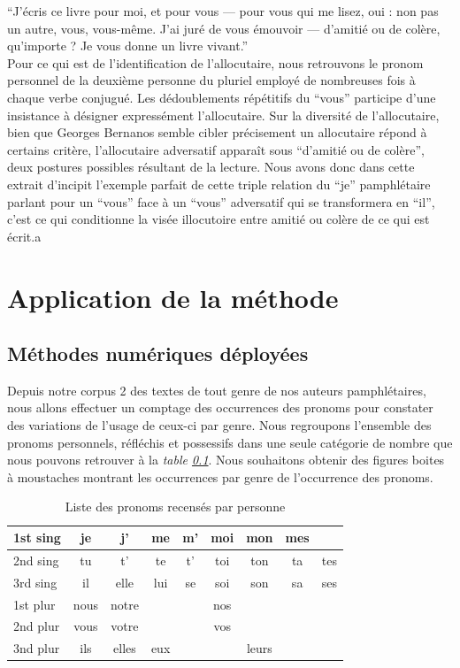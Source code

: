 	\enquote{J'écris ce livre pour moi, et pour vous — pour vous qui me lisez, oui : non pas un autre, vous, vous-même. J'ai juré de vous émouvoir — d'amitié ou de colère, qu'importe ? Je vous donne un livre vivant.}\\

Pour ce qui est de l'identification de l'allocutaire, nous retrouvons le pronom personnel de la deuxième personne du pluriel employé de nombreuses fois à chaque verbe conjugué. Les dédoublements répétitifs du \enquote{vous} participe d'une insistance à désigner expressément l'allocutaire. Sur la diversité de l'allocutaire, bien que Georges Bernanos semble cibler précisement un allocutaire répond à certains critère, l'allocutaire adversatif apparaît sous \enquote{d'amitié ou de colère}, deux postures possibles résultant de la lecture. Nous avons donc dans cette extrait d'incipit l'exemple parfait de cette triple relation du \enquote{je} pamphlétaire parlant pour un \enquote{vous} face à un \enquote{vous} adversatif qui se transformera en \enquote{il}, c'est ce qui conditionne la visée illocutoire entre amitié ou colère de ce qui est écrit.a

\chapter*{Application de la méthode}

\section{Méthodes numériques déployées}

Depuis notre corpus 2 des textes de tout genre de nos auteurs pamphlétaires, nous allons effectuer un comptage des occurrences des pronoms pour constater des variations de l'usage de ceux-ci par genre. Nous regroupons l'ensemble des pronoms personnels, réfléchis et possessifs dans une seule catégorie de nombre que nous pouvons retrouver à la \textit{table \ref{listepronoms}}. Nous souhaitons obtenir des figures boites à moustaches montrant les occurrences par genre de l'occurrence des pronoms.

\begin{table}[ht]
    \centering 
    \begin{tabular}{l c c c c c c c c}
        \toprule
        1st sing & je & j' & me & m' & moi & mon & mes & \\
        \midrule
        2nd sing & tu & t' & te & t' & toi & ton & ta & tes\\
        \midrule
        3rd sing & il & elle & lui & se & soi & son & sa & ses\\
        \midrule
        1st plur & nous & notre & & & nos & & &\\
        \midrule
        2nd plur & vous & votre & & & vos & & &\\
        \midrule
        3nd plur & ils & elles & eux & & & leurs & & \\
        \bottomrule
    \end{tabular}
\caption{Liste des pronoms recensés par personne}
\label{listepronoms}
\end{table} 

